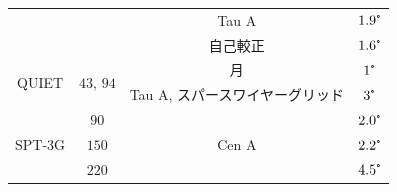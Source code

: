\documentclass[../../main.tex]{subfiles}
\begin{document}
\begin{table}[H]
\begin{tabular}{cccc}
                                                  &                        & Tau A & $1.9\tcdegree$ \\
                                                  &                        & 自己較正\footnotemark[1] & $1.6\tcdegree$ \\
        \hline
        \multirow{2}{*}{QUIET\cite{so:Bischoff_2011}} & \multirow{2}{*}{$43,\,94$} & 月 & $1\tcdegree$ \\
                                                      &                            & Tau A, スパースワイヤーグリッド & $3\tcdegree$ \\
        \hline
        \multirow{3}{*}{SPT-3G\cite{so:SPT3G}} & $90$  & \multirow{3}{*}{Cen A} & $2.0\tcdegree$ \\
                                               & $150$ &                        & $2.2\tcdegree$ \\
                                               & $220$ &                        & $4.5\tcdegree$ \\
        \hline
    \end{tabular}
    \label{tab:so-polarization_calibration}
\end{table}
\end{document}
